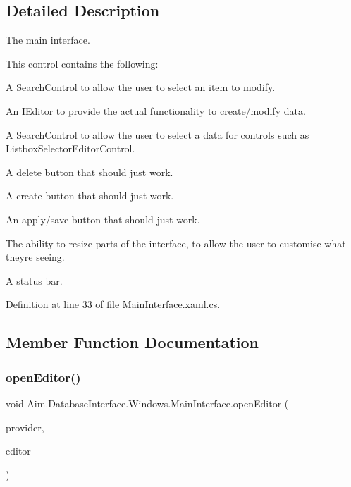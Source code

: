 \subsection{Detailed Description}
The main interface. 

This control contains the following\+:
\begin{DoxyItemize}
\item A Search\+Control to allow the user to select an item to modify.
\item An I\+Editor to provide the actual functionality to create/modify data.
\item A Search\+Control to allow the user to select a data for controls such as Listbox\+Selector\+Editor\+Control.
\item A delete button that should \textquotesingle{}just work\textquotesingle{}.
\item A create button that should \textquotesingle{}just work\textquotesingle{}.
\item An apply/save button that should \textquotesingle{}just work\textquotesingle{}.
\item The ability to resize parts of the interface, to allow the user to customise what they\textquotesingle{}re seeing.
\item A status bar. 
\end{DoxyItemize}

Definition at line 33 of file Main\+Interface.\+xaml.\+cs.



\subsection{Member Function Documentation}
\mbox{\label{class_aim_1_1_database_interface_1_1_windows_1_1_main_interface_a2cfee9030c39c4d8a79c0c218d1e6a60}} 
\subsubsection{\texorpdfstring{open\+Editor()}{openEditor()}}
{\footnotesize\ttfamily void Aim.\+Database\+Interface.\+Windows.\+Main\+Interface.\+open\+Editor (\begin{DoxyParamCaption}\item[{\mbox{\hyperlink{interface_aim_1_1_database_interface_1_1_interfaces_1_1_i_search_provider}{I\+Search\+Provider}}}]{provider,  }\item[{User\+Control}]{editor }\end{DoxyParamCaption})\hspace{0.3cm}{\ttfamily [inline]}}



